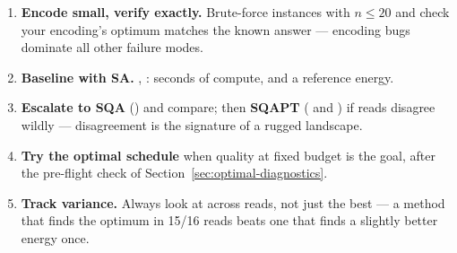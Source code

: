 \begin{enumerate}
\item \textbf{Encode small, verify exactly.} Brute-force instances with
$n\le20$ and check your encoding's optimum matches the known answer ---
encoding bugs dominate all other failure modes.
\item \textbf{Baseline with SA.} ,
: seconds of compute, and a reference energy.
\item \textbf{Escalate to SQA} () and compare; then
\textbf{SQAPT} ( and ) if reads
disagree wildly --- disagreement is the signature of a rugged landscape.
\item \textbf{Try the optimal schedule} when quality at fixed budget is the
goal, after the pre-flight check of
Section~\ref{sec:optimal-diagnostics}.
\item \textbf{Track variance.} Always look at  across
reads, not just the best --- a method that finds the optimum in 15/16 reads
beats one that finds a slightly better energy once.
\end{enumerate}
